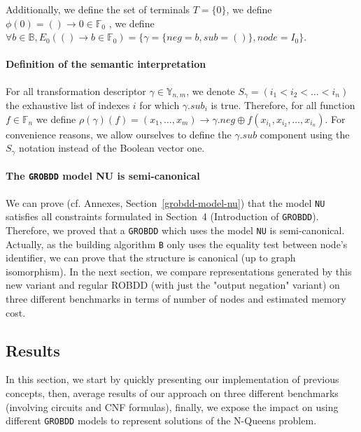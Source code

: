 \documentclass[a4paper,10pt]{article}
\newcommand{\B}{\mathbb{B}}
\newcommand{\F}{\mathbb{F}}
\newcommand{\Y}{\mathbb{Y}}
\newcommand{\GroBdd}{\texttt{GROBDD}}
\begin{document}
Additionally, we define the set of terminals $T=\{0\}$, we define $\phi(0)=()\longrightarrow{}0\in\F_0$ , we define $\forall b\in\B, E_0(()\longrightarrow b\in\F_0) = \{\gamma = \{neg = b, sub = ()\}, node = I_0\}$.

\paragraph{Definition of the semantic interpretation}

For all transformation descriptor $\gamma\in\Y_{n, m}$, we denote $S_\gamma = \left(i_1 < i_2 < \dots < i_n\right)$ the exhaustive list of indexes $i$ for which $\gamma.sub_i$ is true.
Therefore, for all function $f\in\F_n$ we define $\rho(\gamma)(f) = (x_1, \dots, x_m) \longrightarrow \gamma.neg \oplus f(x_{i_1}, x_{i_2}, \dots, x_{i_n})$.
For convenience reasons, we allow ourselves to define the $\gamma.sub$ component using the $S_\gamma$ notation instead of the Boolean vector one.


 
\paragraph{The \GroBdd{} model NU is semi-canonical}
We can prove (cf. Annexes, Section~\ref{grobdd-model-nu}) that the model \texttt{NU} satisfies all constraints formulated in Section~4 (Introduction of \GroBdd{}).
Therefore, we proved that a \GroBdd{} which uses the model \texttt{NU} is semi-canonical.
Actually, as the building algorithm \texttt{B} only uses the equality test between node's identifier, we can prove that the structure is canonical (up to graph isomorphism).
In the next section, we compare representations generated by this new variant and regular ROBDD (with just the "output negation" variant) on three different benchmarks in terms of number of nodes and estimated memory cost.

\subsection{Results}
In this section, we start by quickly presenting our implementation of previous concepts, then, average results of our approach on three different benchmarks (involving circuits and CNF formulas), finally, we expose the impact on using different \GroBdd{} models to represent solutions of the N-Queens problem.
\end{document}
